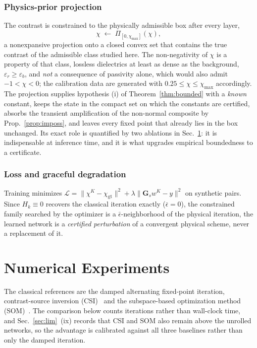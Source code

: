 \documentclass[journal,cmes,article,submit,moreauthors,pdftex]{Definitions/tsp}
\newcommand{\norm}[1]{\lVert #1 \rVert}
\begin{document}
\subsubsection{Physics-prior projection}
The contrast is constrained to the physically admissible box after every layer,
\begin{equation}\label{eq:proj}
\chi \;\leftarrow\; \Pi_{[0,\chi_{\max}]}(\chi),
\end{equation}
a nonexpansive projection onto a closed convex set that contains the true contrast of the
admissible class studied here. The non-negativity of $\chi$ is a property of that class, 
lossless dielectrics at least as dense as the background, $\varepsilon_r\ge\varepsilon_b$, and
\emph{not} a consequence of passivity alone, which would also admit $-1<\chi<0$; the calibration
data are generated with $0.25\le\chi\le\chi_{\max}$ accordingly. The projection supplies
hypothesis (i) of Theorem~\ref{thm:bounded} with a \emph{known} constant,
keeps the state in the compact set on which the constants are certified, absorbs the transient
amplification of the non-normal composite by Prop.~\ref{prop:imposs}, and leaves every fixed point
that already lies in the box unchanged. Its exact role is quantified by two ablations in
Sec.~\ref{sec:exp}: it is indispensable at inference time, and it is what upgrades empirical
boundedness to a certificate.

\subsubsection{Loss and graceful degradation}
Training minimizes
$\mathcal{L}=\norm{\chi^{K}-\chi_{\mathrm{gt}}}^2+\lambda\norm{\mathbf{G}_sw^{K}-y}^2$
on synthetic pairs. Since $H_k\equiv0$ recovers the classical iteration exactly
($\bar\epsilon=0$), the constrained family searched by the optimizer is a
$\bar\epsilon$-neighborhood of the physical iteration, the learned network is a
\emph{certified perturbation} of a convergent physical scheme, never a replacement of it.

\section{Numerical Experiments}\label{sec:exp}
The classical references are the damped alternating fixed-point iteration, contrast-source
inversion (CSI)~\cite{csi_lit} and the subspace-based optimization method (SOM)~\cite{som_lit}.
The comparison below counts iterations rather than wall-clock time, and
Sec.~\ref{sec:lim}~(ix) records that CSI and SOM also remain above the unrolled networks, so the
advantage is calibrated against all three baselines rather than only the damped iteration.
\end{document}
